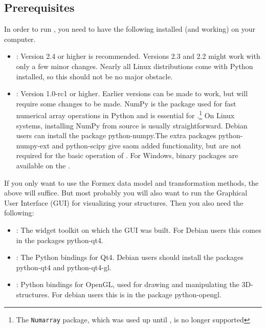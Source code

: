 \subsection{Prerequisites}
\label{sec:prerequisites}
In order to run \pyformex, you need to have the following installed (and working) on your computer.
\begin{itemize}
\item {}: Version 2.4 or higher is recommended. Versions 2.3 and 2.2 might work with only a few minor changes.
Nearly all Linux distributions come with Python installed, so this should not be no major obstacle.
\item {}: Version 1.0-rc1 or higher. Earlier versions can be made to work, but will require some changes to be made. NumPy is the package used for fast numerical array operations in Python and is essential for \pyformex.\footnote{The \texttt{Numarray} package, which was used up until , is no longer supported }
On Linux systems, installing NumPy from source is usually straightforward. Debian users can install the package python-numpy.The extra packages python-numpy-ext and python-scipy give saom added functionality, but are not required for the basic operation of \pyf. For Windows, binary packages are available on the .
\end{itemize}
If you only want to use the Formex data model and transformation methods, the above will suffice. But most probably you will also want to run the \pyformex Graphical User Interface (GUI) for visualizing your structures. Then you also need the following:
\begin{itemize}
\item {}: The widget toolkit on which the GUI was built. For Debian users this  comes in the packages python-qt4.
\item {}: The Python bindings for Qt4. Debian users should install the packages python-qt4 and python-qt4-gl.
\item {}: Python bindings for OpenGL, used for drawing and manipulating the 3D-structures. For debian users this is in the package python-opengl.
\end{itemize}

